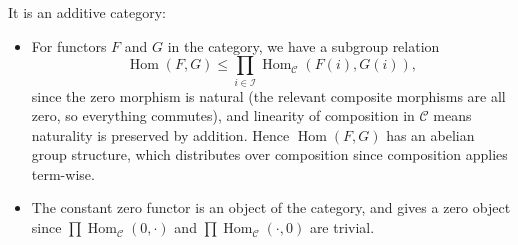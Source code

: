 \documentclass{report}
\newcommand{\I}{\mathscr{I}}
\newcommand{\scrC}{\mathscr{C}}
\DeclareMathOperator{\Hom}{Hom}
\begin{document}
\begin{enumerate}[label=\textbf{2.3.\Alph*.}]
	      It is an additive category:
	      \begin{itemize}
		      \item For functors $F$ and $G$ in the category, we have a subgroup
		            relation
		            \begin{equation*}
			            \Hom(F,G) \le \prod_{i\in\I}\Hom_\scrC(F(i),G(i)),
		            \end{equation*}
		            since the zero morphism is natural (the relevant composite
		            morphisms are all zero, so everything commutes), and linearity
		            of composition in $\scrC$ means naturality is preserved by
		            addition. Hence $\Hom(F,G)$ has an abelian group structure,
		            which distributes over composition since composition applies
		            term-wise.

		      \item The constant zero functor is an object of the category, and
		            gives a zero object since $\prod\Hom_\scrC(0,\cdot)$ and
		            $\prod\Hom_\scrC(\cdot,0)$ are trivial.


\end{itemize}
\end{enumerate}
\end{document}
